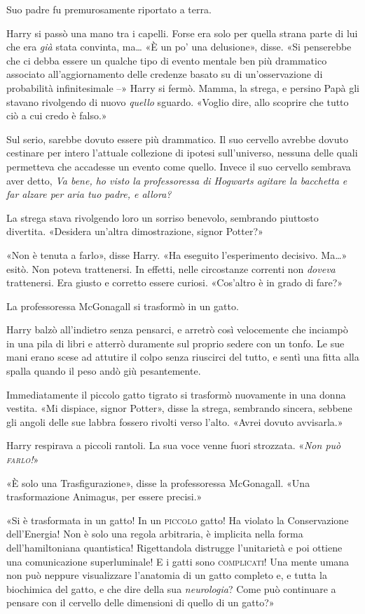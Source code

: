 Suo padre fu premurosamente riportato a terra.

Harry si passò una mano tra i capelli. Forse era solo per quella strana parte di lui che era \emph{già} stata convinta, ma… «È un po’ una delusione», disse. «Si penserebbe che ci debba essere un qualche tipo di evento mentale ben più drammatico associato all’aggiornamento delle credenze basato su di un’osservazione di probabilità infinitesimale –» Harry si fermò. Mamma, la strega, e persino Papà gli stavano rivolgendo di nuovo \emph{quello} sguardo. «Voglio dire, allo scoprire che tutto ciò a cui credo è falso.»

Sul serio, sarebbe dovuto essere più drammatico. Il suo cervello avrebbe dovuto cestinare per intero l’attuale collezione di ipotesi sull’universo, nessuna delle quali permetteva che accadesse un evento come quello. Invece il suo cervello sembrava aver detto, \emph{Va bene, ho visto la professoressa di Hogwarts agitare la bacchetta e far alzare per aria tuo padre, e allora?}

La strega stava rivolgendo loro un sorriso benevolo, sembrando piuttosto divertita. «Desidera un’altra dimostrazione, signor Potter?»

«Non è tenuta a farlo», disse Harry. «Ha eseguito l’esperimento decisivo. Ma…» esitò. Non poteva trattenersi. In effetti, nelle circostanze correnti non \emph{doveva} trattenersi. Era giusto e corretto essere curiosi. «Cos’altro è in grado di fare?»

La professoressa McGonagall si trasformò in un gatto.

Harry balzò all’indietro senza pensarci, e arretrò così velocemente che inciampò in una pila di libri e atterrò duramente sul proprio sedere con un tonfo. Le sue mani erano scese ad attutire il colpo senza riuscirci del tutto, e sentì una fitta alla spalla quando il peso andò giù pesantemente.

Immediatamente il piccolo gatto tigrato si trasformò nuovamente in una donna vestita. «Mi dispiace, signor Potter», disse la strega, sembrando sincera, sebbene gli angoli delle sue labbra fossero rivolti verso l’alto. «Avrei dovuto avvisarla.»

Harry respirava a piccoli rantoli. La sua voce venne fuori strozzata. «\emph{Non può \textsc{farlo}!}»

«È solo una Trasfigurazione», disse la professoressa McGonagall. «Una trasformazione Animagus, per essere precisi.»

«Si è trasformata in un gatto! In un \textsc{piccolo} gatto! Ha violato la Conservazione dell’Energia! Non è solo una regola arbitraria, è implicita nella forma dell’hamiltoniana quantistica! Rigettandola distrugge l’unitarietà e poi ottiene una comunicazione superluminale! E i gatti sono \textsc{complicati}! Una mente umana non può neppure visualizzare l’anatomia di un gatto completo e, e tutta la biochimica del gatto, e che dire della sua \textit{neurologia}? Come può continuare a pensare con il cervello delle dimensioni di quello di un gatto?»


